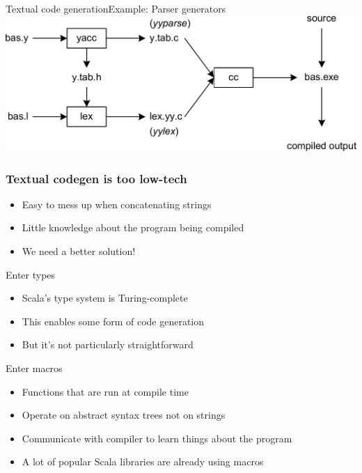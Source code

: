 \documentclass{beamer}
\begin{document}
\begin{frame}[fragile]{Textual code generation}{Example: Parser generators}
  \includegraphics[width=\linewidth]{img/yacc.png}
\end{frame}

\begin{frame}[fragile]
\frametitle{Textual codegen is too low-tech}
  \begin{itemize}
  \item Easy to mess up when concatenating strings
  \item Little knowledge about the program being compiled
  \item We need a better solution!
  \end{itemize}
\end{frame}

\begin{frame}{Enter types}
  \begin{itemize}
  \item Scala's type system is Turing-complete
  \item This enables some form of code generation
  \item But it's not particularly straightforward
  \end{itemize}
\end{frame}


\begin{frame}{Enter macros}
  \begin{itemize}
  \item Functions that are run at compile time
  \item Operate on abstract syntax trees not on strings
  \item Communicate with compiler to learn things about the program
  \item A lot of popular Scala libraries are already using macros
  \end{itemize}
\end{frame}
\end{document}
